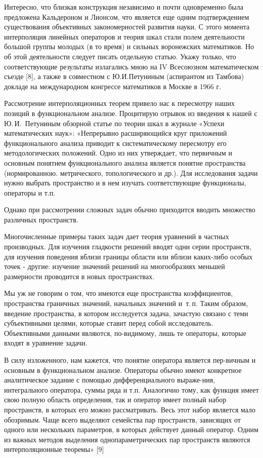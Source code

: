Интересно, что близкая конструкция независимо и почти одновременно была предложена Кальдероном и Лионсом, что является еще одним подтверждением существования объективных закономерностей развития науки. С этого момента интерполяция линейных операторов и теория шкал стали полем деятельности большой группы молодых (в то время) и сильных воронежских математиков. Но об этой деятельности следует писать отдельную статью. Укажу только, что соответствующие результаты излагались мною на IV Всесоюзном математическом съезде [8], а также в совместном с Ю.И.Петуниным (аспирантом из Тамбова) докладе на международном конгрессе математиков в Москве в 1966 г.

Рассмотрение интерполяционных теорем привело нас к пересмотру наших позиций в функциональном анализе.
\linebreak
Процитирую отрывок из введения к нашей с Ю.\,И.~Петуниным обзорной статье по теории шкал в журнале
«Успехи математических наук»:
«Непрерывно расширяющийся круг приложений функционального анализа приводит к систематическому пересмотру его методологических положений. Одно из них утверждает, что первичным и основным понятием функционального анализа является понятие пространства (нормированною. метрического, топологического и др.). Для исследования задачи нужно выбрать пространство и в нем изучать соответствующие функционалы, операторы и т.п.

Однако при рассмотрении сложных задач обычно приходится вводить множество различных пространств.

Многочисленные примеры таких задач дает теория уравнений в частных производных. Для изучения гладкости решений вводят одни серии пространств, для изучения поведения вблизи границы области или вблизи каких-либо особых точек - другие: изучение значений решений на многообразиях меньшей размерности проводится в новых пространствах.

Мы уж не говорим о том, что имеются еще пространства коэффициентов,
пространства граничных значений, начальных значений и~т.\,п.
Таким образом, введение пространства, в котором исследуется задача, зачастую связано с теми су\-бъ\-е\-к\-ти\-в\-ны\-ми целями, которые ставит перед собой исследователь. Объективными данными являются, по-видимому, лишь те операторы, которые входят в уравнение задачи.

В силу изложенного, нам кажется, что понятие оператора является пер-вичным и основным в функциональном анализе. Операторы обычно имеют конкретное аналитическое задание с помощью дифференциального выраже-ния, интегрального оператора, суммы ряда и т.п. Аналогично тому, как функция имеет свою полную область определения, так и оператор имеет полный набор пространств, в которых его можно рассматривать. Весь этот набор является мало обозримым. Чаще всего выделяют семейства пар пространств, зависящих от одного или нескольких параметров, в которых действует данный оператор. Одним из важных методов выделения однопараметрических пар пространств являются интерполяционные теоремы» [9]

